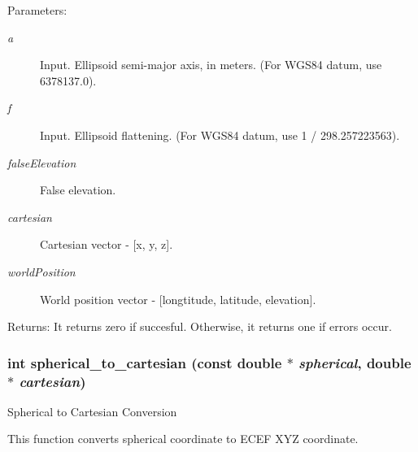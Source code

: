 \begin{Desc}
\item[Parameters:]
\begin{description}
\item[{\em a}]Input. Ellipsoid semi-major axis, in meters. (For WGS84 datum, use 6378137.0). \item[{\em f}]Input. Ellipsoid flattening. (For WGS84 datum, use 1 / 298.257223563). \item[{\em falseElevation}]False elevation. \item[{\em cartesian}]Cartesian vector - \mbox{[}x, y, z\mbox{]}. \item[{\em worldPosition}]World position vector - \mbox{[}longtitude, latitude, elevation\mbox{]}.\end{description}
\end{Desc}
\begin{Desc}
\item[Returns:]It returns zero if succesful. Otherwise, it returns one if errors occur. \end{Desc}
\hypertarget{group__Coordinate_g17c6892e2beefcd95412a53c01815940}{
\subsubsection[spherical\_\-to\_\-cartesian]{\setlength{\rightskip}{0pt plus 5cm}int spherical\_\-to\_\-cartesian (const double $\ast$ {\em spherical}, \/  double $\ast$ {\em cartesian})}}
\label{group__Coordinate_g17c6892e2beefcd95412a53c01815940}


Spherical to Cartesian Conversion 

This function converts spherical coordinate to ECEF XYZ coordinate.

